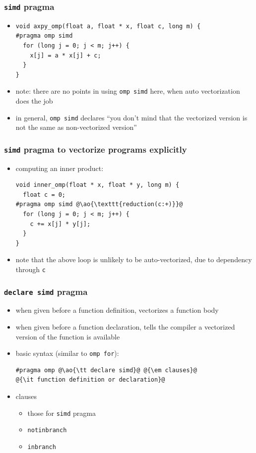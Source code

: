 \documentclass[12pt,dvipdfmx]{beamer}
\newcommand{\ao}[1]{{\color{blue}#1}}
\begin{document}
\begin{frame}[fragile]
\frametitle{{\tt simd} pragma}
\begin{itemize}
\item []
\begin{lstlisting}
void axpy_omp(float a, float * x, float c, long m) {
#pragma omp simd
  for (long j = 0; j < m; j++) {
    x[j] = a * x[j] + c;
  }
}
\end{lstlisting}

\item note: 
  there are no points in using \texttt{omp simd} here,
  when auto vectorization does the job

\item in general, \texttt{omp simd} declares ``you don't mind
  that the vectorized version is not the same as non-vectorized version''

\end{itemize}
\end{frame}


\begin{frame}[fragile]
\frametitle{{\tt simd} pragma to vectorize programs explicitly}
\begin{itemize}
\item computing an inner product:
\begin{lstlisting}
void inner_omp(float * x, float * y, long m) {
  float c = 0;
#pragma omp simd @\ao{\texttt{reduction(c:+)}}@
  for (long j = 0; j < m; j++) {
    c += x[j] * y[j];
  }
}
\end{lstlisting}

\item note that the above loop is unlikely to be auto-vectorized,
  due to dependency through \texttt{c}

\end{itemize}
\end{frame}



\begin{frame}[fragile]
\frametitle{{\tt declare simd} pragma}
\begin{itemize}
\item when given before a function definition,
  vectorizes a function body
\item when given before a function declaration,
  tells the compiler a vectorized version of the function is available
\item basic syntax (similar to {\tt omp for}):
\begin{lstlisting}
#pragma omp @\ao{\tt declare simd}@ @{\em clauses}@
@{\it function definition or declaration}@
\end{lstlisting}

\item clauses
  \begin{itemize}
  \item those for {\tt simd} pragma
  \item {\tt notinbranch}
  \item {\tt inbranch}
  \end{itemize}
\end{itemize}
\end{frame}
\end{document}
